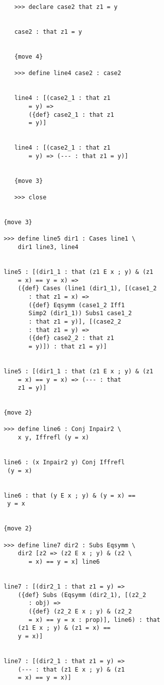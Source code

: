 \documentclass[12pt]{article}
\begin{document}
\begin{verbatim}
            >>> declare case2 that z1 = y


            case2 : that z1 = y


            {move 4}

            >>> define line4 case2 : case2


            line4 : [(case2_1 : that z1 
                = y) => 
                ({def} case2_1 : that z1 
                = y)]


            line4 : [(case2_1 : that z1 
                = y) => (--- : that z1 = y)]


            {move 3}

            >>> close


         {move 3}

         >>> define line5 dir1 : Cases line1 \
             dir1 line3, line4


         line5 : [(dir1_1 : that (z1 E x ; y) & (z1 
             = x) == y = x) => 
             ({def} Cases (line1 (dir1_1), [(case1_2 
                : that z1 = x) => 
                ({def} Eqsymm (case1_2 Iff1 
                Simp2 (dir1_1)) Subs1 case1_2 
                : that z1 = y)], [(case2_2 
                : that z1 = y) => 
                ({def} case2_2 : that z1 
                = y)]) : that z1 = y)]


         line5 : [(dir1_1 : that (z1 E x ; y) & (z1 
             = x) == y = x) => (--- : that 
             z1 = y)]


         {move 2}

         >>> define line6 : Conj Inpair2 \
             x y, Iffrefl (y = x)


         line6 : (x Inpair2 y) Conj Iffrefl 
          (y = x)


         line6 : that (y E x ; y) & (y = x) == 
          y = x


         {move 2}

         >>> define line7 dir2 : Subs Eqsymm \
             dir2 [z2 => (z2 E x ; y) & (z2 \
                = x) == y = x] line6


         line7 : [(dir2_1 : that z1 = y) => 
             ({def} Subs (Eqsymm (dir2_1), [(z2_2 
                : obj) => 
                ({def} (z2_2 E x ; y) & (z2_2 
                = x) == y = x : prop)], line6) : that 
             (z1 E x ; y) & (z1 = x) == 
             y = x)]


         line7 : [(dir2_1 : that z1 = y) => 
             (--- : that (z1 E x ; y) & (z1 
             = x) == y = x)]



\end{verbatim}
\end{document}
